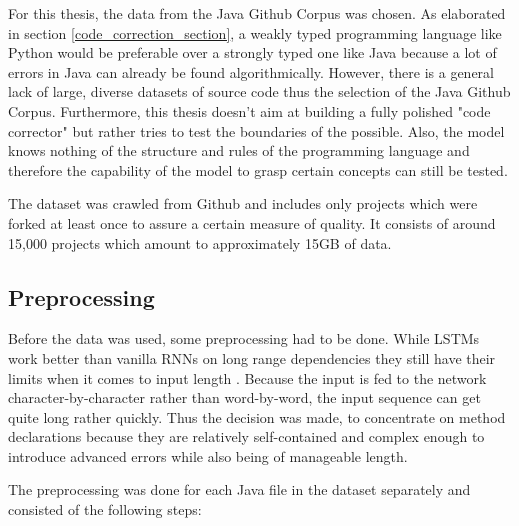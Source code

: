 For this thesis, the data from the Java Github Corpus \cite{java_dataset} was chosen. As elaborated in section \ref{code_correction_section}, a weakly typed programming language like Python would be preferable over a strongly typed one like Java because a lot of errors in Java can already be found algorithmically. However, there is a general lack of large, diverse datasets of source code thus the selection of the Java Github Corpus. Furthermore, this thesis doesn't aim at building a fully polished "code corrector" but rather tries to test the boundaries of the possible. Also, the model knows nothing of the structure and rules of the programming language and therefore the capability of the model to grasp certain concepts can still be tested.

The dataset was crawled from Github and includes only projects which were forked at least once to assure a certain measure of quality. It consists of around 15,000 projects which amount to approximately 15GB of data.

\subsection{Preprocessing}

Before the data was used, some preprocessing had to be done. While LSTMs work better than vanilla RNNs on long range dependencies they still have their limits when it comes to input length \cite{timestep_limitation}. Because the input is fed to the network character-by-character rather than word-by-word, the input sequence can get quite long rather quickly. Thus the decision was made, to concentrate on method declarations because they are relatively self-contained and complex enough to introduce advanced errors while also being of manageable length.

The preprocessing was done for each Java file in the dataset separately and consisted of the following steps:

